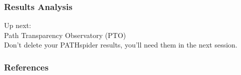 \documentclass{beamer}
\begin{document}
\begin{frame}
\frametitle{Results Analysis}
\begin{center}
{\LARGE Up next: \\
Path Transparency Observatory (PTO)} \\
Don't delete your PATHspider results, you'll need them in the next session.
\end{center}
\end{frame}

\begin{frame}[allowframebreaks]
\frametitle{References}


\end{frame}
\end{document}
